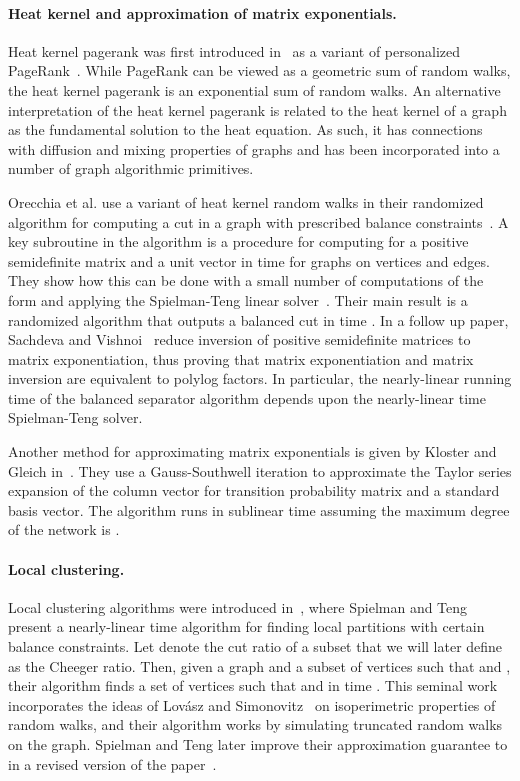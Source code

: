 \documentclass[runningheads,a4paper]{llncs}
\begin{document}
\paragraph{Heat kernel and approximation of matrix exponentials.} Heat kernel
pagerank was first introduced in~\cite{chung:hkpr:07} as a variant of
personalized PageRank~\cite{haveliwala2002topic}.  While PageRank can be
viewed as a geometric sum of random walks, the heat kernel pagerank is an
exponential sum of random walks.  An alternative interpretation of the heat
kernel pagerank is related to the heat kernel of a graph as the fundamental
solution to the heat equation.  As such, it has connections with diffusion and
mixing properties of graphs and has been incorporated into a number of graph
algorithmic primitives.

Orecchia et al. use a variant of heat kernel random walks in their randomized
algorithm for computing a cut in a graph with prescribed balance
constraints~\cite{osv:balsep:11}.  A key subroutine in the algorithm is a
procedure for computing  for a positive semidefinite matrix  and a
unit vector  in time  for graphs on  vertices and  edges.
They show how this can be done with a small number of computations of the form
 and applying the Spielman-Teng linear
solver~\cite{st:graphpartitioning:stoc04}.  Their main result is a randomized
algorithm that outputs a balanced cut in time .  In a follow up
paper, Sachdeva and Vishnoi~\cite{sachdeva2013matrix} reduce inversion of
positive semidefinite matrices to matrix exponentiation, thus proving that
matrix exponentiation and matrix inversion are equivalent to polylog factors.
In particular, the nearly-linear running time of the balanced separator
algorithm depends upon the nearly-linear time Spielman-Teng solver.

Another method for approximating matrix exponentials is given by Kloster and
Gleich in~\cite{kloster:columnexp:waw13}.  They use a Gauss-Southwell iteration
to approximate the Taylor series expansion of the column vector  for
transition probability matrix  and  a standard basis vector.  The
algorithm runs in sublinear time assuming the maximum degree of the network is
.

\paragraph{Local clustering.} Local clustering algorithms were introduced
in~\cite{st:graphpartitioning:stoc04}, where Spielman and Teng present a
nearly-linear time algorithm for finding local partitions with certain balance
constraints.  Let  denote the cut ratio of a subset  that we will
later define as the Cheeger ratio.  Then, given a graph and a subset of vertices
 such that  and , their algorithm
finds a set of vertices  such that  and  in time .  This seminal
work incorporates the ideas of Lov\'asz and
Simonovitz~\cite{ls:mixingisoperimetric:90,ls:randomwalks:93} on isoperimetric
properties of random walks, and their algorithm works by simulating truncated
random walks on the graph.  Spielman and Teng later improve their approximation
guarantee to  in a revised version of the
paper~\cite{st:localcluster:08}.
\end{document}
